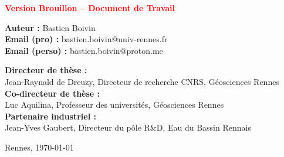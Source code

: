 \begin{titlepage}
\begin{center}
      {\Large\textcolor{red}{\textbf{Version Brouillon – Document de Travail}}}
      \vspace{2cm}
  
      {\large
        \textbf{Auteur :} Bastien Boivin\\[0.3cm]
        \textbf{Email (pro) :} bastien.boivin@univ-rennes.fr\\
        \textbf{Email (perso) :} bastien.boivin@proton.me\\[1cm]
      }
  
      \noindent
      \begin{flushleft}
        \textbf{Directeur de thèse :}\\
        Jean-Raynald de Dreuzy, Directeur de recherche CNRS, Géosciences Rennes\\[0.5cm]
        \textbf{Co-directeur de thèse :}\\
        Luc Aquilina, Professeur des universités, Géosciences Rennes\\[0.5cm]
        \textbf{Partenaire industriel :}\\
        Jean-Yves Gaubert, Directeur du pôle R\&D, Eau du Bassin Rennais\\
      \end{flushleft}
  
      \vfill
      Rennes, \today
    \end{center}
  \end{titlepage}